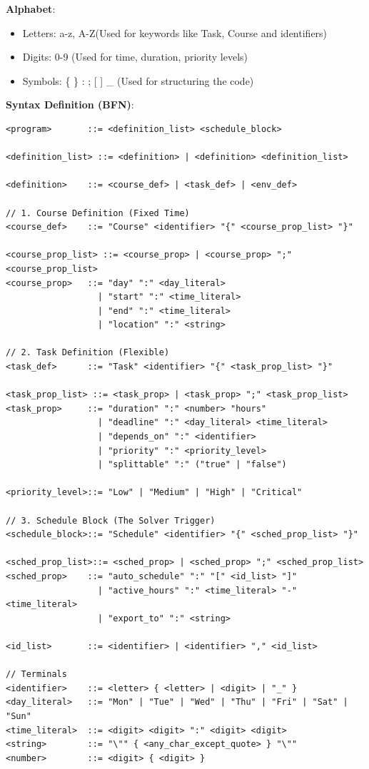 \textbf{Alphabet}:
\begin{itemize}
    \item Letters: a-z, A-Z(Used for keywords like Task, Course and identifiers)
    \item Digits: 0-9 (Used for time, duration, priority levels)
    \item Symbols: \{ \} : ; [ ] \_ (Used for structuring the code)
\end{itemize}

\textbf{Syntax Definition (BFN)}:

\begin{lstlisting}[style=cleancpp]
<program>       ::= <definition_list> <schedule_block>

<definition_list> ::= <definition> | <definition> <definition_list>

<definition>    ::= <course_def> | <task_def> | <env_def>

// 1. Course Definition (Fixed Time)
<course_def>    ::= "Course" <identifier> "{" <course_prop_list> "}"

<course_prop_list> ::= <course_prop> | <course_prop> ";" <course_prop_list>
<course_prop>   ::= "day" ":" <day_literal>
                  | "start" ":" <time_literal>
                  | "end" ":" <time_literal>
                  | "location" ":" <string>

// 2. Task Definition (Flexible)
<task_def>      ::= "Task" <identifier> "{" <task_prop_list> "}"

<task_prop_list> ::= <task_prop> | <task_prop> ";" <task_prop_list>
<task_prop>     ::= "duration" ":" <number> "hours"
                  | "deadline" ":" <day_literal> <time_literal>
                  | "depends_on" ":" <identifier>
                  | "priority" ":" <priority_level>
                  | "splittable" ":" ("true" | "false")

<priority_level>::= "Low" | "Medium" | "High" | "Critical"

// 3. Schedule Block (The Solver Trigger)
<schedule_block>::= "Schedule" <identifier> "{" <sched_prop_list> "}"

<sched_prop_list>::= <sched_prop> | <sched_prop> ";" <sched_prop_list>
<sched_prop>    ::= "auto_schedule" ":" "[" <id_list> "]"
                  | "active_hours" ":" <time_literal> "-" <time_literal>
                  | "export_to" ":" <string>

<id_list>       ::= <identifier> | <identifier> "," <id_list>

// Terminals
<identifier>    ::= <letter> { <letter> | <digit> | "_" }
<day_literal>   ::= "Mon" | "Tue" | "Wed" | "Thu" | "Fri" | "Sat" | "Sun"
<time_literal>  ::= <digit> <digit> ":" <digit> <digit>
<string>        ::= "\"" { <any_char_except_quote> } "\""
<number>        ::= <digit> { <digit> }
\end{lstlisting}

